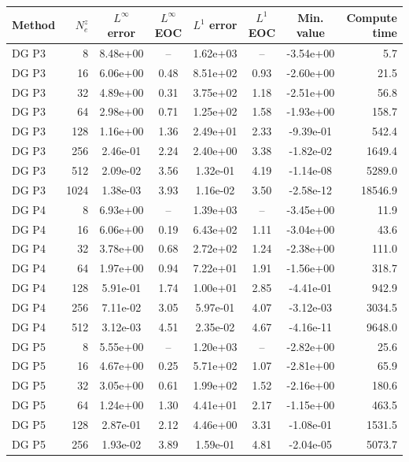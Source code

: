\begin{tabular}{l r c c c c c r}
\toprule
Method & $N_e^z$ & $L^\infty$ error & $L^\infty$ EOC & $L^1$ error & $L^1$ EOC & Min. value & Compute time \\
\midrule
  DG P3 & 8 & 8.48e+00 & -- & 1.62e+03 & -- & -3.54e+00 & 5.7 \\
  DG P3 & 16 & 6.06e+00 & 0.48 & 8.51e+02 & 0.93 & -2.60e+00 & 21.5 \\
  DG P3 & 32 & 4.89e+00 & 0.31 & 3.75e+02 & 1.18 & -2.51e+00 & 56.8 \\
  DG P3 & 64 & 2.98e+00 & 0.71 & 1.25e+02 & 1.58 & -1.93e+00 & 158.7 \\
  DG P3 & 128 & 1.16e+00 & 1.36 & 2.49e+01 & 2.33 & -9.39e-01 & 542.4 \\
  DG P3 & 256 & 2.46e-01 & 2.24 & 2.40e+00 & 3.38 & -1.82e-02 & 1649.4 \\
  DG P3 & 512 & 2.09e-02 & 3.56 & 1.32e-01 & 4.19 & -1.14e-08 & 5289.0 \\
  DG P3 & 1024 & 1.38e-03 & 3.93 & 1.16e-02 & 3.50 & -2.58e-12 & 18546.9 \\
\midrule
  DG P4 & 8 & 6.93e+00 & -- & 1.39e+03 & -- & -3.45e+00 & 11.9 \\
  DG P4 & 16 & 6.06e+00 & 0.19 & 6.43e+02 & 1.11 & -3.04e+00 & 43.6 \\
  DG P4 & 32 & 3.78e+00 & 0.68 & 2.72e+02 & 1.24 & -2.38e+00 & 111.0 \\
  DG P4 & 64 & 1.97e+00 & 0.94 & 7.22e+01 & 1.91 & -1.56e+00 & 318.7 \\
  DG P4 & 128 & 5.91e-01 & 1.74 & 1.00e+01 & 2.85 & -4.41e-01 & 942.9 \\
  DG P4 & 256 & 7.11e-02 & 3.05 & 5.97e-01 & 4.07 & -3.12e-03 & 3034.5 \\
  DG P4 & 512 & 3.12e-03 & 4.51 & 2.35e-02 & 4.67 & -4.16e-11 & 9648.0 \\
\midrule
  DG P5 & 8 & 5.55e+00 & -- & 1.20e+03 & -- & -2.82e+00 & 25.6 \\
  DG P5 & 16 & 4.67e+00 & 0.25 & 5.71e+02 & 1.07 & -2.81e+00 & 65.9 \\
  DG P5 & 32 & 3.05e+00 & 0.61 & 1.99e+02 & 1.52 & -2.16e+00 & 180.6 \\
  DG P5 & 64 & 1.24e+00 & 1.30 & 4.41e+01 & 2.17 & -1.15e+00 & 463.5 \\
  DG P5 & 128 & 2.87e-01 & 2.12 & 4.46e+00 & 3.31 & -1.08e-01 & 1531.5 \\
  DG P5 & 256 & 1.93e-02 & 3.89 & 1.59e-01 & 4.81 & -2.04e-05 & 5073.7 \\

\end{tabular}
